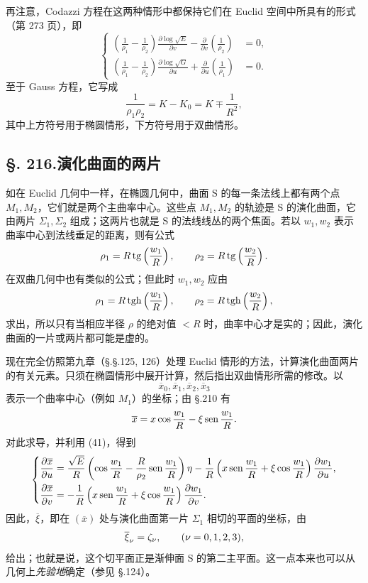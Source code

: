 再注意，Codazzi 方程在这两种情形中都保持它们在 Euclid 空间中所具有的形式（第 273 页），即
\[
\tag{42}
\left\{
\begin{aligned}
\left(\frac1{\rho_1}-\frac1{\rho_2}\right)\frac{\partial\log\sqrt E}{\partial v}-\frac{\partial}{\partial v}\left(\frac1{\rho_2}\right)&=0,\\
\left(\frac1{\rho_1}-\frac1{\rho_2}\right)\frac{\partial\log\sqrt G}{\partial u}+\frac{\partial}{\partial u}\left(\frac1{\rho_1}\right)&=0.
\end{aligned}\right.
\]
至于 Gauss 方程，它写成
\[
\tag{43}
\frac1{\rho_1\rho_2}=K-K_0=K\mp \frac1{R^2},
\]
其中上方符号用于椭圆情形，下方符号用于双曲情形。

\subsection*{\S. 216.\quad 演化曲面的两片}

如在 Euclid 几何中一样，在椭圆几何中，曲面 S 的每一条法线上都有两个点 $M_1,M_2$，它们就是两个主曲率中心。这些点 $M_1,M_2$ 的轨迹是 S 的演化曲面，它由两片 $\Sigma_1,\Sigma_2$ 组成；这两片也就是 S 的法线线丛的两个焦面。若以 $w_1,w_2$ 表示曲率中心到法线垂足的距离，则有公式
\[
\rho_1=R\operatorname{tg}\left(\frac{w_1}{R}\right),\qquad
\rho_2=R\operatorname{tg}\left(\frac{w_2}{R}\right).
\]
在双曲几何中也有类似的公式；但此时 $w_1,w_2$ 应由
\[
\rho_1=R\operatorname{tgh}\left(\frac{w_1}{R}\right),\qquad
\rho_2=R\operatorname{tgh}\left(\frac{w_2}{R}\right),
\]
求出，所以只有当相应半径 $\rho$ 的绝对值 $<R$ 时，曲率中心才是实的；因此，演化曲面的一片或两片都可能是虚的。

现在完全仿照第九章（\S.\S.125, 126）处理 Euclid 情形的方法，计算演化曲面两片的有关元素。只须在椭圆情形中展开计算，然后指出双曲情形所需的修改。以
\[
\overline{x}_0,\overline{x}_1,\overline{x}_2,\overline{x}_3
\]
表示一个曲率中心（例如 $M_1$）的坐标；由 \S.210 有
\[
\overline{x}=x\cos\frac{w_1}{R}-\xi\operatorname{sen}\frac{w_1}{R}.
\]
对此求导，并利用 (41)，得到
\[
\left\{
\begin{aligned}
\frac{\partial\overline{x}}{\partial u}&=\frac{\sqrt E}{R}\left(\cos\frac{w_1}{R}-\frac{R}{\rho_2}\operatorname{sen}\frac{w_1}{R}\right)\eta
-\frac1R\left(x\operatorname{sen}\frac{w_1}{R}+\xi\cos\frac{w_1}{R}\right)\frac{\partial w_1}{\partial u},\\
\frac{\partial\overline{x}}{\partial v}&=-\frac1R\left(x\operatorname{sen}\frac{w_1}{R}+\xi\cos\frac{w_1}{R}\right)\frac{\partial w_1}{\partial v}.
\end{aligned}\right.
\]
因此，$\overline\xi$，即在 $(\overline{x})$ 处与演化曲面第一片 $\Sigma_1$ 相切的平面的坐标，由
\[
\overline{\xi}_\nu=\zeta_\nu,\qquad (\nu=0,1,2,3),
\]
给出；也就是说，这个切平面正是渐伸面 S 的第二主平面。这一点本来也可以从几何上\emph{先验地}确定（参见 \S.124）。

